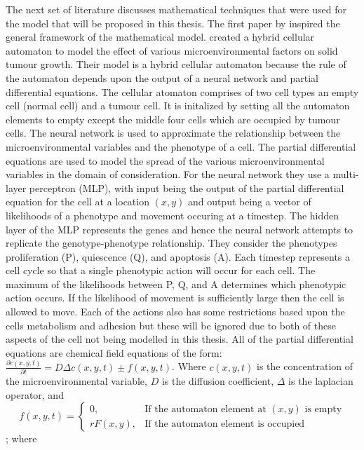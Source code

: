 \documentclass[\main/thesis.tex]{subfiles}
\begin{document}
The next set of literature discusses mathematical techniques that were used 
for the model that will be proposed in this thesis. The first paper by 
\textcite{Gerlee} inspired the general framework of the mathematical model. 
\textcite{Gerlee} created a hybrid cellular automaton to model the effect of 
various microenvironmental factors on solid tumour growth. Their model is a 
hybrid cellular automaton because the rule of the automaton depends upon the 
output of a neural network and partial differential equations. The cellular 
atomaton comprises of two cell types an empty cell (normal cell) and a tumour 
cell. It is initalized by setting all the automaton elements to empty except 
the middle four cells which are occupied by tumour cells. The neural 
network is used to approximate the relationship between the microenvironmental 
variables and the phenotype of a cell. The partial differential equations are 
used to model the spread of the various microenvironmental variables in the 
domain of consideration. For the neural network they use a multi-layer 
perceptron (MLP), with input being the output of the partial differential 
equation for the cell at a location $(x, y)$ and output being a vector of 
likelihoods of a phenotype and movement occuring at a timestep. The hidden 
layer of the MLP represents the genes and hence the neural network attempts to 
replicate the genotype-phenotype relationship. They consider the phenotypes 
proliferation (P), quiescence (Q), and apoptosis (A). Each timestep represents a 
cell cycle so that a single phenotypic action will occur for each cell. The 
maximum of the likelihoods between P, Q, and A determines which phenotypic 
action occurs. If the likelihood of movement is sufficiently large then the cell 
is allowed to move. Each of the actions also has some restrictions based upon 
the cells metabolism and adhesion but these will be ignored due to both of these 
aspects of the cell not being modelled in this thesis. All of the partial 
differential equations are chemical field equations of the form: $\frac{\partial 
c(x, y, t)}{\partial t} = D \Delta c(x, y, t) \pm f(x, y, t)$. Where $c(x, y, 
t)$ is the concentration of the microenvironmental variable, $D$ is the 
diffusion coefficient, $\Delta$ is the laplacian operator, and $$f(x, y, t) 
= \begin{cases} 0, &\text{If the automaton element at } (x, y) \text{ is empty} 
\\ rF(x, y), &\text{If the automaton element is occupied} \end{cases}$$; where 
\end{document}
